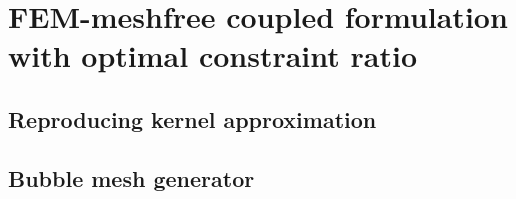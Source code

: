 \section{FEM-meshfree coupled formulation with optimal constraint ratio}
\subsection{Reproducing kernel approximation}
\subsection{Bubble mesh generator}
